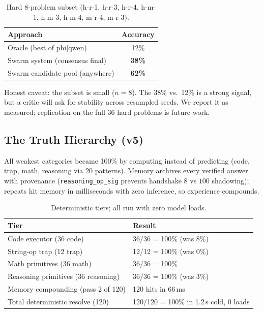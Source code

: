 \documentclass[conference,compsoc]{IEEEtran}
\begin{document}
\begin{table}[htbp]
\centering
\caption{Hard 8-problem subset (h-r-1, h-r-3, h-r-4, h-m-1, h-m-3, h-m-4, m-r-4, m-r-3).}
\label{tab:emergence}
\begin{tabular}{@{}lc@{}}
\toprule
Approach & Accuracy \\
\midrule
Oracle (best of phi$|$qwen) & 12\% \\
Swarm system (consensus final) & \textbf{38\%} \\
Swarm candidate pool (anywhere) & \textbf{62\%} \\
\bottomrule
\end{tabular}
\end{table}

Honest caveat: the subset is small ($n=8$). The 38\% vs.\ 12\% is a strong signal, but a critic will ask for stability across resampled seeds. We report it as measured; replication on the full 36 hard problems is future work.

\subsection{The Truth Hierarchy (v5)}
All weakest categories became 100\% by computing instead of predicting (code, trap, math, reasoning via 20 patterns). Memory archives every verified answer with provenance (\texttt{reasoning\_op\_sig} prevents handshake $8$ vs $100$ shadowing); repeats hit memory in milliseconds with zero inference, so experience compounds.

\begin{table}[htbp]
\centering
\caption{Deterministic tiers; all run with zero model loads.}
\label{tab:tiers}
\begin{tabular}{@{}ll@{}}
\toprule
Tier & Result \\
\midrule
Code executor (36 code) & 36/36 = 100\% (was 8\%) \\
String-op trap (12 trap) & 12/12 = 100\% (was 0\%) \\
Math primitives (36 math) & 36/36 = 100\% \\
Reasoning primitives (36 reasoning) & 36/36 = 100\% (was 3\%) \\
Memory compounding (pass 2 of 120) & 120 hits in 66\,ms \\
Total deterministic resolve (120) & 120/120 = 100\% in 1.2\,s cold, 0 loads \\
\bottomrule
\end{tabular}
\end{table}
\end{document}
